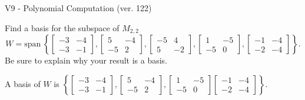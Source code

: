 \begin{exercise}
  \begin{exerciseTitle}V9 - Polynomial Computation (ver. 122)\end{exerciseTitle}
  \begin{exerciseStatement}
    Find a basis for the subspace of \(M_{2,2}\) 
\[W=\mathrm{span}\ \left\{\left[\begin{array}{cc}
-3 & -4 \\
-3 & -1
\end{array}\right] , \left[\begin{array}{cc}
5 & -4 \\
-5 & 2
\end{array}\right] , \left[\begin{array}{cc}
-5 & 4 \\
5 & -2
\end{array}\right] , \left[\begin{array}{cc}
1 & -5 \\
-5 & 0
\end{array}\right] , \left[\begin{array}{cc}
-1 & -4 \\
-2 & -4
\end{array}\right]\right\}.\]
 Be sure to explain why your result is a basis.


  \end{exerciseStatement}
  \begin{exerciseAnswer}
   A basis of \(W\) is  \(\left\{\left[\begin{array}{cc}
-3 & -4 \\
-3 & -1
\end{array}\right] , \left[\begin{array}{cc}
5 & -4 \\
-5 & 2
\end{array}\right] , \left[\begin{array}{cc}
1 & -5 \\
-5 & 0
\end{array}\right] \left[\begin{array}{cc}
-1 & -4 \\
-2 & -4
\end{array}\right]\right\}\).
  


  \end{exerciseAnswer}
\end{exercise}